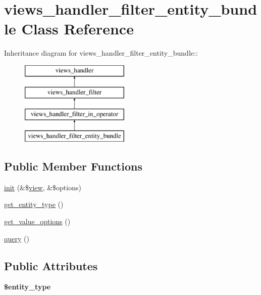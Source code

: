 \hypertarget{classviews__handler__filter__entity__bundle}{
\section{views\_\-handler\_\-filter\_\-entity\_\-bundle Class Reference}
\label{classviews__handler__filter__entity__bundle}
}
Inheritance diagram for views\_\-handler\_\-filter\_\-entity\_\-bundle::\begin{figure}[H]
\begin{center}
\leavevmode
\includegraphics[height=4cm]{classviews__handler__filter__entity__bundle}
\end{center}
\end{figure}
\subsection*{Public Member Functions}
\begin{DoxyCompactItemize}
\item 
\hyperlink{classviews__handler__filter__entity__bundle_aec203c1ccc0f4189a1fba3fae621ce9c}{init} (\&\$\hyperlink{classview}{view}, \&\$options)
\item 
\hyperlink{classviews__handler__filter__entity__bundle_a90304eeee421b79a79003a1de1738410}{get\_\-entity\_\-type} ()
\item 
\hyperlink{classviews__handler__filter__entity__bundle_afc776cdf6360bbd658c2e918c1da8822}{get\_\-value\_\-options} ()
\item 
\hyperlink{classviews__handler__filter__entity__bundle_a383511f8da47317cb77498e2705b9470}{query} ()
\end{DoxyCompactItemize}
\subsection*{Public Attributes}
\begin{DoxyCompactItemize}
\item 
\hypertarget{classviews__handler__filter__entity__bundle_ab968a1decf012d5cb39c9444a112befb}{
{\bfseries \$entity\_\-type}}
\label{classviews__handler__filter__entity__bundle_ab968a1decf012d5cb39c9444a112befb}

\end{DoxyCompactItemize}


